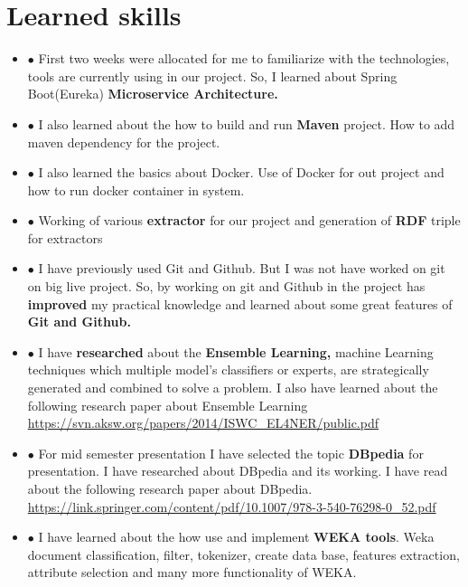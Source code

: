 \documentclass{llncs}
\begin{document}
\section{Learned skills}
\begin {itemize}


\item[$\bullet$ ]  First two weeks were allocated for me to familiarize with the technologies, tools are currently using in our project. So, I learned about Spring Boot(Eureka) \textbf{Microservice Architecture.}
\item[$\bullet$ ]  I also learned about the how to build and run\textbf{ Maven} project. How to add maven dependency for the project.
\item[$\bullet$ ]  I also learned the basics about Docker. Use of Docker for out project and how to run docker container in system. 
\item[$\bullet$ ]  Working of various \textbf{extractor} for our project and generation of\textbf{ RDF} triple for extractors
\item[$\bullet$ ]  I have previously used Git and Github. But I was not have worked on git on big live project. So, by working on git and Github in the project has \textbf{improved} my practical knowledge and learned about some great features of \textbf{Git and Github.}
\item[$\bullet$ ]  I have \textbf{researched }about the \textbf{Ensemble Learning,} machine Learning techniques which multiple model’s classifiers or experts, are strategically generated and combined to solve a problem. I also have learned about the following research paper about Ensemble Learning\\
\color{red}
\url{https://svn.aksw.org/papers/2014/ISWC_EL4NER/public.pdf}
\color{black}
\item[$\bullet$ ]  For mid semester presentation I have selected the topic \textbf{DBpedia} for presentation. I have researched about DBpedia and its working. I have read about the following research paper about DBpedia.\\
\color{red}
\url{https://link.springer.com/content/pdf/10.1007/978-3-540-76298-0_52.pdf}
\color{black}
\item[$\bullet$ ] I have learned about the how use and implement\textbf{ WEKA tools}. Weka document classification, filter, tokenizer, create data base, features extraction, attribute selection and many more functionality of WEKA.
\end{itemize}
\end{document}
